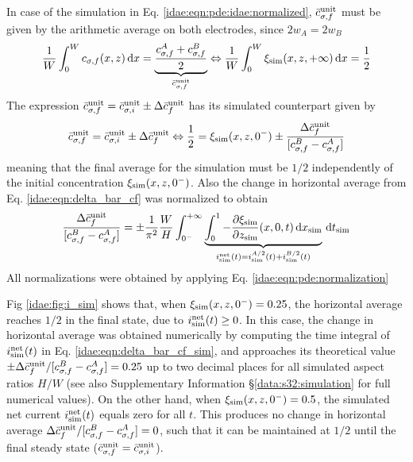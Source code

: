 In case of the simulation in Eq. \eqref{idae:eqn:pde:idae:normalized},
$\bar{c}_{\sigma,f}^{\text{unit}}$ must be given by 
the arithmetic average on both electrodes, since $2w_{A} = 2w_{B}$
\begin{equation}
	\frac{1}{W} \int_{0}^{W} c_{\sigma,f}(x,z) \,\mathrm{d}x
	= \underbrace{\frac{c_{\sigma,f}^{A} + c_{\sigma,f}^{B}}{2} }_{ \bar{c}_{\sigma,f}^{\text{unit}} }
	\Leftrightarrow
	\frac{1}{W} \int_{0}^{W} \xi_{\mathrm{sim}}(x,z,+\infty) \,\mathrm{d}x = \frac{1}{2}
\end{equation}
The expression
$\bar{c}_{\sigma,f}^{\text{unit}} = \bar{c}_{\sigma,i}^{\text{unit}} \pm \Delta \bar{c}_{f}^{\text{unit}}$
has its simulated counterpart given by
\begin{equation}
	\bar{c}_{\sigma,f}^{\text{unit}}
	= \bar{c}_{\sigma,i}^{\text{unit}} \pm \Delta \bar{c}_{f}^{\text{unit}}
	\Leftrightarrow
	\frac{1}{2} 
	= \xi_{\mathrm{sim}}(x,z,0^{-})
	\pm \frac{\Delta\bar{c}_{f}^{\text{unit}}}{[c_{\sigma,f}^{B} - c_{\sigma,f}^{A}]}
\end{equation}
meaning that the final average for the simulation must be $1/2$
independently of the initial concentration $\xi_{\mathrm{sim}}(x,z,0^{-})$.
Also the change in horizontal average from Eq. \eqref{idae:eqn:delta_bar_cf}
was normalized to obtain
\begin{equation}
	\label{idae:eqn:delta_bar_cf_sim}
	\frac{\Delta\bar{c}_{f}^{\text{unit}}}{[c_{\sigma,f}^{B} - c_{\sigma,f}^{A}]}
	= \pm \frac{1}{\pi^{2}} \frac{W}{H}
	\int_{0^{-}}^{+\infty}
		\underbrace{
			\int_{0}^{1}
				-\frac{\partial \xi_{\mathrm{sim}}}{\partial z_{\mathrm{sim}}}(x,0,t)
			\,\mathrm{d}x_{\mathrm{sim}}
		}_{
			i_{\mathrm{sim}}^{\text{net}}(t) 
			= i_{\mathrm{sim}}^{A/2}(t) + i_{\mathrm{sim}}^{B/2}(t)
		}
	\,\mathrm{d}t_{\mathrm{sim}}
\end{equation}
All normalizations were obtained by applying Eq. \eqref{idae:eqn:pde:normalization}

Fig \ref{idae:fig:i_sim} shows that, when $\xi_{\mathrm{sim}}(x,z,0^{-}) = \num{0,25}$,
the horizontal average reaches $1/2$ in the final state, due to $i_{\mathrm{sim}}^{\text{net}}(t) \geq 0$.
In this case, the change in horizontal average was obtained numerically
by computing the time integral of $i_{\mathrm{sim}}^{\text{net}}(t)$ in Eq. \eqref{idae:eqn:delta_bar_cf_sim},
and approaches its theoretical value
$\pm \Delta\bar{c}_{f}^{\text{unit}}/[c_{\sigma,f}^{B} - c_{\sigma,f}^{A}] = \num{0,25}$
up to two decimal places for all simulated aspect ratios $H/W$
(see also Supplementary Information \S\ref{data:s32:simulation} for full numerical values).
On the other hand, when $\xi_{\mathrm{sim}}(x,z,0^{-}) = \num{0,5}$,
the simulated net current $i_{\mathrm{sim}}^{\text{net}}(t)$ equals zero for all $t$.
This produces no change in horizontal average
$\Delta\bar{c}_{f}^{\text{unit}}/[c_{\sigma,f}^{B} - c_{\sigma,f}^{A}] = 0$,
such that it can be maintained at $1/2$  until the final steady state ($\bar{c}_{\sigma,f}^{\text{unit}} = \bar{c}_{\sigma,i}^{\text{unit}}$).

